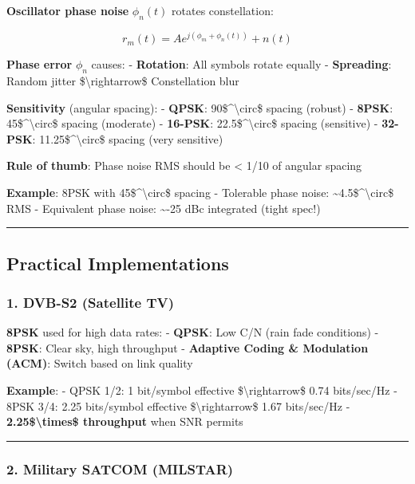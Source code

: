 \textbf{Oscillator phase noise} \(\phi_n(t)\) rotates constellation:

\[
r_m(t) = A e^{j(\phi_m + \phi_n(t))} + n(t)
\]

\textbf{Phase error} \(\phi_n\) causes: - \textbf{Rotation}: All symbols
rotate equally - \textbf{Spreading}: Random jitter
\$\textbackslash rightarrow\$ Constellation blur

\textbf{Sensitivity} (angular spacing): - \textbf{QPSK}:
90\$\^{}\textbackslash circ\$ spacing (robust) - \textbf{8PSK}:
45\$\^{}\textbackslash circ\$ spacing (moderate) - \textbf{16-PSK}:
22.5\$\^{}\textbackslash circ\$ spacing (sensitive) - \textbf{32-PSK}:
11.25\$\^{}\textbackslash circ\$ spacing (very sensitive)

\textbf{Rule of thumb}: Phase noise RMS should be \textless{} 1/10 of
angular spacing

\textbf{Example}: 8PSK with 45\$\^{}\textbackslash circ\$ spacing -
Tolerable phase noise: \textasciitilde4.5\$\^{}\textbackslash circ\$ RMS
- Equivalent phase noise: \textasciitilde-25 dBc integrated (tight
spec!)

\begin{center}\rule{0.5\linewidth}{0.5pt}\end{center}

\subsection{Practical Implementations}\label{practical-implementations}

\subsubsection{1. DVB-S2 (Satellite TV)}\label{dvb-s2-satellite-tv}

\textbf{8PSK} used for high data rates: - \textbf{QPSK}: Low C/N (rain
fade conditions) - \textbf{8PSK}: Clear sky, high throughput -
\textbf{Adaptive Coding \& Modulation (ACM)}: Switch based on link
quality

\textbf{Example}: - QPSK 1/2: 1 bit/symbol effective
\$\textbackslash rightarrow\$ 0.74 bits/sec/Hz - 8PSK 3/4: 2.25
bits/symbol effective \$\textbackslash rightarrow\$ 1.67 bits/sec/Hz -
\textbf{2.25\$\textbackslash times\$ throughput} when SNR permits

\begin{center}\rule{0.5\linewidth}{0.5pt}\end{center}

\subsubsection{2. Military SATCOM
(MILSTAR)}\label{military-satcom-milstar}

